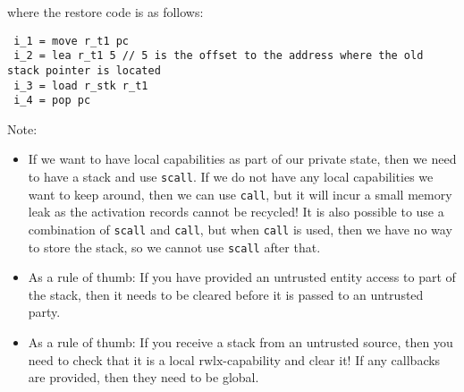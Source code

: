 \documentclass[a4paper]{article}
\newcommand{\plainperm}[1]{\mathrm{#1}}
\newcommand{\rwlx}{\plainperm{rwlx}}
\begin{document}
where the restore code is as follows:
\begin{lstlisting}
 i_1 = move r_t1 pc
 i_2 = lea r_t1 5 // 5 is the offset to the address where the old stack pointer is located
 i_3 = load r_stk r_t1
 i_4 = pop pc
\end{lstlisting}
Note:
\begin{itemize}
\item If we want to have local capabilities as part of our private state, then we need to have a stack and use \texttt{scall}. If we do not have any local capabilities we want to keep around, then we can use \texttt{call}, but it will incur a small memory leak as the activation records cannot be recycled! It is also possible to use a combination of \texttt{scall} and \texttt{call}, but when \texttt{call} is used, then we have no way to store the stack, so we cannot use \texttt{scall} after that.
\item As a rule of thumb: If you have provided an untrusted entity access to part of the stack, then it needs to be cleared before it is passed to an untrusted party.
\item As a rule of thumb: If you receive a stack from an untrusted source, then you need to check that it is a local $\rwlx$-capability and clear it! If any callbacks are provided, then they need to be global.
\end{itemize}
\end{document}
